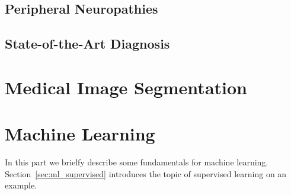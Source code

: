 \subsection{Peripheral Neuropathies}

\subsection{State-of-the-Art Diagnosis}

\section{Medical Image Segmentation}

\section{Machine Learning}
In this part we brielfy describe some fundamentals for machine learning. Section~\ref{sec:ml_supervised} introduces the topic of supervised learning on an example.

